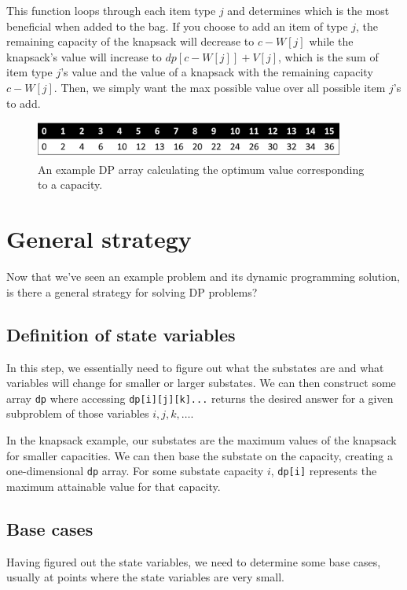 This function loops through each item type $j$ and determines which is the most beneficial when added to the bag.  If you choose to add an item of type $j$, the remaining capacity of the knapsack will decrease to $c - W[j]$ while the knapsack's value will increase to $dp[c - W[j]] + V[j]$, which is the sum of item type $j$'s value and the value of a knapsack with the remaining capacity $c - W[j]$.  Then, we simply want the max possible value over all possible item $j$'s to add.

\begin{figure}[h]
\vspace{10pt}
\centering
\includegraphics[width=4in]{images/knapsack2.png}
\caption{An example DP array calculating the optimum value corresponding to a capacity.}
\end{figure}


\section{General strategy}
Now that we've seen an example problem and its dynamic programming solution, is there a general strategy for solving DP problems?

\subsection{Definition of state variables}
In this step, we essentially need to figure out what the substates are and what variables will change for smaller or larger substates.  We can then construct some array \verb=dp= where accessing \verb=dp[i][j][k]...= returns the desired answer for a given subproblem of those variables $i, j, k, \ldots$.

In the knapsack example, our substates are the maximum values of the knapsack for smaller capacities.  We can then base the substate on the capacity, creating a one-dimensional \verb=dp= array.  For some substate capacity $i$, \verb=dp[i]= represents the maximum attainable value for that capacity.

\subsection{Base cases}
Having figured out the state variables, we need to determine some base cases, usually at points where the state variables are very small.

